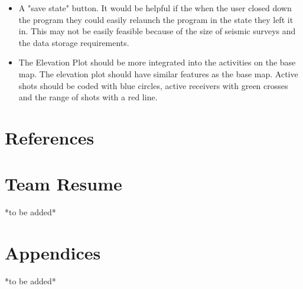 \documentclass[12pt]{article}
\begin{document}
\begin{itemize}
\item A "save state" button. It would be helpful if the when the user closed down the program they could easily relaunch the program in the state they left it in. This may not be easily feasible because of the size of seismic surveys and the data storage requirements. 

\item The Elevation Plot should be more integrated into the activities on the base map. The elevation plot should have similar features as the base map. Active shots should be coded with blue circles, active receivers with green crosses and the range of shots with a red line.
\end{itemize}

\newpage
\section{References}

\printbibliography

\newpage
\section{Team Resume}

*to be added*

%

\newpage
\section{Appendices}

*to be added*
\end{document}
